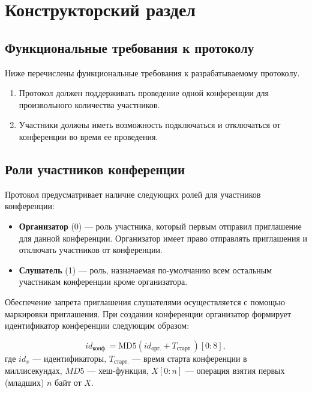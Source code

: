 \chapter{Конструкторский раздел}

\section{Функциональные требования к протоколу}

Ниже перечислены функциональные требования к разрабатываемому протоколу.

\begin{enumerate}
    \item Протокол должен поддерживать проведение одной конференции для произвольного количества участников.
    \item Участники должны иметь возможность подключаться и отключаться от конференции во время ее проведения.
\end{enumerate}

\section{Роли участников конференции}

Протокол предусматривает наличие следующих ролей для участников конференции:
\begin{itemize}[label=---]
  \item \textbf{Организатор} (0) --- роль участника, который первым отправил приглашение для данной конференции.
  Организатор имеет право отправлять приглашения и отключать участников от конференции.
  \item \textbf{Слушатель} (1) --- роль, назначаемая по-умолчанию всем остальным участникам конференции кроме организатора.
\end{itemize}

Обеспечение запрета приглашения слушателями осуществляется с помощью маркировки приглашения.
При создании конференции организатор формирует идентификатор конференции следующим образом:

\begin{equation}
  \textit{id}_\textrm{конф.} = \textrm{MD5}(\textit{id}_\textrm{орг.} + T_\textrm{старт.})[0:8], \label{eq:conf-id}
\end{equation}
где $id_x$ --- идентификаторы, $T_\textrm{старт.}$ --- время старта конференции в миллисекундах, $MD5$ --- хеш-функция, $X[0:n]$ --- операция взятия первых (младших) $n$ байт от $X$.

